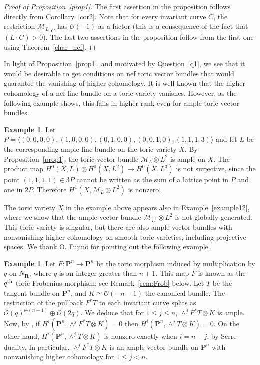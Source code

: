 \documentclass[12pt]{amsart}
\theoremstyle{definition}
\newtheorem{example}[lemma]{Example}
\theoremstyle{remark}
\begin{document}
\begin{proof}[Proof of Proposition~\ref{prop1}]
The first assertion
in the proposition follows directly from
Corollary~\ref{cor2}. Note that for every 
invariant curve $C$, the restriction ${\mathcal{M}}_L\vert_C$ has ${\mathcal{O}}(-1)$ as
a factor (this is a consequence of the fact that $(L\cdot C)>0$).
The last two assertions in the proposition follow from the first one using
Theorem~\ref{char_nef}.
\end{proof}

\bigskip

In light of Proposition~\ref{prop1}, and motivated by
Question~\ref{q1}, we see that it would be desirable to get
conditions on nef toric vector bundles that would guarantee the
vanishing of higher cohomology. It is well-known that the higher
cohomology of a nef line bundle on a toric variety vanishes.
However, as the following example shows,
 this fails in higher rank even for ample toric vector bundles.
 
 \begin{example}  \label{non_vanishing}
Let $P= {\langle} (0,0,0,0), (1,0,0,0), (0,1,0,0), (0,0,1,0), 
(1,1,1,3) {\rangle}$ and let $L$ be the corresponding ample line bundle
on the toric variety $X$.  By Proposition~\ref{prop1}, the toric vector bundle ${\mathcal{M}}_L \otimes L^2$ is ample on $X$.  The product map $H^0(X,L) \otimes H^0(X, L^2) \rightarrow H^0(X, L^3)$ is not surjective, since the point $(1,1,1,1) \in 3P$ cannot be written as the sum of a lattice point in $P$ and one in $2P$.  Therefore $H^1(X, {\mathcal{M}}_L \otimes L^2)$ is nonzero.
 \end{example}

\noindent The toric variety $X$ in the example above appears also in Example~\ref{example12}, where we show that the ample vector bundle ${\mathcal{M}}_{L^3} \otimes L^2$ is not globally generated.  This toric variety is singular, but there are also ample vector bundles with nonvanishing higher cohomology on smooth toric varieties, including projective spaces.  We thank O. Fujino for pointing out the following example. 

 \begin{example}\label{Fujino}
Let $F: {{\mathbf P}}^n \rightarrow {{\mathbf P}}^n$ be the toric morphism induced by multiplication by $q$ on $N_{{\mathbf R}}$, where $q$ is an integer greater than $n+1$.  This map $F$ is known as the $q^{\rm th}$ toric Frobenius morphism; see Remark~\ref{rem:Frob} below.  Let $T$ be the tangent bundle on ${{\mathbf P}}^n$, and $K \simeq {\mathcal{O}}(-n-1)$ the canonical bundle.  The restriction of the pullback $F^* T$ to each invariant curve splits as  ${\mathcal{O}}(q)^{\oplus (n-1)}\oplus{\mathcal{O}}(2q)$.  We deduce that for $1 \leq j \leq n$, $\wedge^j F^*T \otimes K$ is ample.  Now, by \cite[Proposition~3.5]{Fujino}, if
$H^i({{\mathbf P}}^n, \wedge^j F^* T \otimes K)=0$ then 
$H^i({{\mathbf P}}^n, \wedge^j T \otimes K)=0$. On the other hand, $H^i({{\mathbf P}}^n, \wedge^j T \otimes K)$ is nonzero exactly when $i = n-j$, by Serre duality.  In particular, $\wedge^j F^* T \otimes K$ is an ample vector bundle on ${{\mathbf P}}^n$ with nonvanishing higher cohomology for $1 \leq j < n$.
 \end{example}
\end{document}
